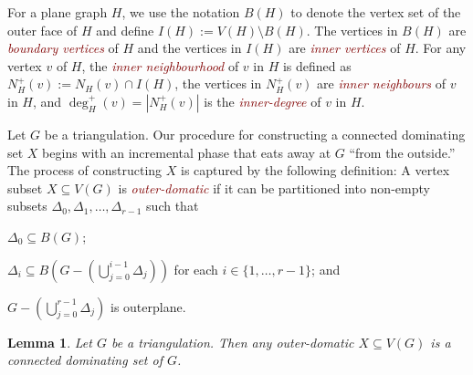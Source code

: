 \documentclass[11pt]{article}
\newtheorem{lem}{Lemma}
\newcommand{\defin}[1]{\emph{\textcolor{Maroon}{#1}}}
\theoremstyle{definition}
\begin{document}
For a plane graph $H$, we use the notation $B(H)$ to denote the vertex set of the outer face of $H$ and define $I(H):=V(H)\setminus B(H)$.  The vertices in $B(H)$ are \defin{boundary vertices} of $H$ and the vertices in $I(H)$ are \defin{inner vertices} of $H$. For any vertex $v$ of $H$, the \defin{inner neighbourhood} of $v$ in $H$ is defined as $N_H^+(v):=N_H(v)\cap I(H)$, the vertices in $N^+_H(v)$ are \defin{inner neighbours} of $v$ in $H$, and $\deg^+_H(v)=|N^+_H(v)|$ is the \defin{inner-degree} of $v$ in $H$.

Let $G$ be a triangulation.  Our procedure for constructing a connected dominating set $X$ begins with an incremental phase that eats away at $G$ ``from the outside.'' The process of constructing $X$ is captured by the following definition:   A vertex subset $X\subseteq V(G)$ is \defin{outer-domatic} if it can be partitioned into non-empty subsets $\Delta_0,\Delta_1,\ldots,\Delta_{r-1}$ such that
\begin{compactenum}[(P1)]
    \item $\Delta_0\subseteq B(G)$; \label{outer_face}
    \item $\Delta_i\subseteq B(G-(\bigcup_{j=0}^{i-1}\Delta_j))$ for each $i\in\{1,\ldots,r-1\}$; and \label{incremental}
    \item $G-(\bigcup_{j=0}^{r-1}\Delta_j)$ is outerplane. \label{outerplanar}
\end{compactenum}

\begin{lem}\label{outer_domatic}
    Let $G$ be a triangulation.  Then any outer-domatic $X\subseteq V(G)$ is a connected dominating set of $G$.
\end{lem}
\end{document}
